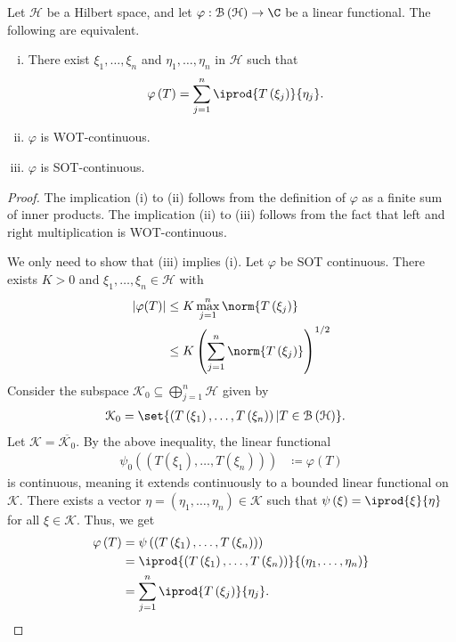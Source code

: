 \documentclass[10pt]{mypackage}
\begin{document}
\begin{proposition}
  Let $\mathcal{H}$ be a Hilbert space, and let $\varphi: \mathcal{B}\left(\mathcal{H}\right)\rightarrow \C$ be a linear functional. The following are equivalent.
  \begin{enumerate}[(i)]
    \item There exist $\xi_1,\dots,\xi_n$ and $\eta_1,\dots,\eta_n$ in $\mathcal{H}$ such that
      \begin{align*}
        \varphi\left(T\right) &= \sum_{j=1}^{n} \iprod{T\left(\xi_j\right)}{\eta_j}.
      \end{align*}
    \item $\varphi$ is WOT-continuous.
    \item $\varphi$ is SOT-continuous.
  \end{enumerate}
\end{proposition}
\begin{proof}
  The implication (i) to (ii) follows from the definition of $\varphi$ as a finite sum of inner products. The implication (ii) to (iii) follows from the fact that left and right multiplication is WOT-continuous.\newline

  We only need to show that (iii) implies (i). Let $\varphi$ be SOT continuous. There exists $K > 0$ and $\xi_1,\dots,\xi_n\in \mathcal{H}$ with
  \begin{align*}
    \left\vert \varphi(T) \right\vert &\leq K\max_{j=1}^{n}\norm{T\left(\xi_j\right)}\\
                                      &\leq K \left(\sum_{j=1}^{n}\norm{T\left(\xi_j\right)}\right)^{1/2}
  \end{align*}
  Consider the subspace $\mathcal{K}_0\subseteq \bigoplus_{j=1}^{n}\mathcal{H}$ given by
  \begin{align*}
    \mathcal{K}_0 &= \set{\left(T\left(\xi_1\right),\dots,T\left(\xi_n\right)\right) | T\in \mathcal{B}\left(\mathcal{H}\right)}.
  \end{align*}
  Let $\mathcal{K} = \overline{\mathcal{K}_0}$. By the above inequality, the linear functional
  \begin{align*}
    \psi_0\left(\left(T\left(\xi_1\right),\dots,T\left(\xi_n\right)\right)\right) &\coloneq \varphi(T)
  \end{align*}
  is continuous, meaning it extends continuously to a bounded linear functional on $\mathcal{K}$. There exists a vector $\eta = \left(\eta_1,\dots,\eta_n\right)\in \mathcal{K}$ such that $\psi\left(\xi\right) = \iprod{\xi}{\eta}$ for all $\xi\in \mathcal{K}$. Thus, we get
  \begin{align*}
    \varphi\left(T\right) &= \psi\left(\left(T\left(\xi_1\right),\dots,T\left(\xi_n\right)\right)\right)\\
                          &= \iprod{\left(T\left(\xi_1\right),\dots,T\left(\xi_n\right)\right)}{\left(\eta_1,\dots,\eta_n\right)}\\
                          &= \sum_{j=1}^{n} \iprod{T\left(\xi_j\right)}{\eta_j}.
  \end{align*}
\end{proof}
\end{document}
